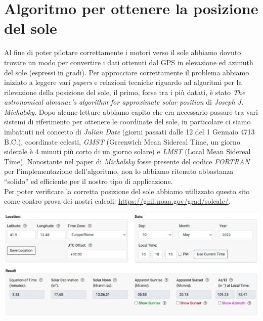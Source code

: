 \hypertarget{algoritmo-per-ottenere-la-posizione-del-sole}{%
\section{Algoritmo per ottenere la posizione del
sole}\label{algoritmo-per-ottenere-la-posizione-del-sole}}

\noindent Al fine di poter pilotare correttamente i motori verso il sole abbiamo
dovuto trovare un modo per convertire i dati ottenuti dal GPS in
elevazione ed azimuth del sole (espressi in gradi). Per approcciare
correttamente il problema abbiamo iniziato a leggere vari \emph{papers}
e relazioni tecniche riguardo ad algoritmi per la rilevazione della
posizione del sole, il primo, forse tra i più datati, è stato \emph{The
astronomical almanac's algorithm for approximate solar position} di
\emph{Joseph J. Michalsky}. Dopo alcune letture abbiamo capito che era
necessario passare tra vari sistemi di riferimento per ottenere le
coordinate del sole, in particolare ci siamo imbattuti nel concetto di
\emph{Julian Date} (giorni passati dalle 12 del 1 Gennaio 4713 B.C.),
coordinate celesti, \emph{GMST} (Greenwich Mean Sidereal Time, un giorno
siderale è 4 minuti più corto di un giorno solare) e \emph{LMST} (Local
Mean Sidereal Time). Nonostante nel paper di \emph{Michalsky} fosse
presente del codice \emph{FORTRAN} per l'implementazione dell'algoritmo,
non lo abbiamo ritenuto abbastanza ``solido'' ed efficiente per il
nostro tipo di applicazione.\\
Per poter verificare la corretta posizione del sole abbiamo utilizzato
questo sito come contro prova dei nostri calcoli:
\href{https://gml.noaa.gov/grad/solcalc/}{\underline{https://gml.noaa.gov/grad/solcalc/}}.

\begin{center}
\includegraphics[scale=0.35]{figures/image72.png}
\captionsetup{type=figure}
\end{center}

